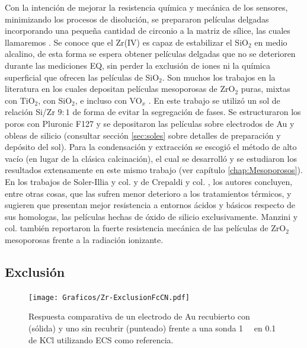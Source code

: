 			Con la intención de mejorar la resistencia química y mecánica de los sensores, minimizando los procesos de disolución, se prepararon películas delgadas incorporando una pequeña cantidad de circonio a la matriz de sílice, las cuales llamaremos \pdmZ. Se conoce que el Zr(IV) es capaz de estabilizar el SiO$_2$ en medio alcalino\cite{Soler-Illia2004}, de esta forma se espera obtener películas delgadas que no se deterioren durante las mediciones EQ, sin perder la exclusión de iones ni la química superficial que ofrecen las películas de SiO$_2$. Son muchos los trabajos en la literatura en los cuales depositan películas mesoporosas de ZrO$_2$ puras, mixtas con TiO$_2$, con SiO$_2$, e incluso con VO$_x$ \cite{Andrini2016,Soler-Illia2004,Crepaldi2002a,Gimenez2016,Zelcer2013,Calvo20210,Angelome2008}. En este trabajo se utilizó un sol de relación Si/Zr $9\!:\!1$ de forma de evitar la segregación de fases\cite{Soler-Illia2004}. Se estructuraron los poros con Pluronic F127 y se depositaron las películas sobre electrodos de Au y obleas de silicio (consultar sección \ref{sec:soles} sobre detalles de preparación y depósito del sol). Para la condensación y extracción se escogió el método de alto vacío (en lugar de la clásica calcinación), el cual se desarrolló y se estudiaron los resultados extensamente en este mismo trabajo (ver capítulo \ref{chap:Mesoporosos}). En los trabajos de Soler-Illia y col.\cite{Soler-Illia2004} y de Crepaldi y col. \cite{Crepaldi2002a}, los autores concluyen, entre otras cosas, que las \pdmZ\space sufren menor deterioro a los tratamientos térmicos, y sugieren que presentan mejor resistencia a entornos ácidos y básicos respecto de sus homologas, las películas hechas de óxido de silicio exclusivamente. Manzini y col.\cite{Gimenez2016} también reportaron la fuerte resistencia mecánica de las películas de ZrO$_2$ mesoporosas frente a la radiación ionizante.

	 \subsection{Exclusión}

 			\begin{figure}[b!]
			\centering
	 	    \texttt{[image: Graficos/Zr-ExclusionFcCN.pdf]}
	        \caption[Exclusión electrostática en \pdmZ]{Respuesta comparativa de un electrodo de Au recubierto con \pdmZ\space (sólida) y uno sin recubrir (punteado) frente a una sonda \ferroferri\space \SI{1}{\milli\Molar} en \SI{0.1}{\Molar} de KCl utilizando ECS como referencia.}
	        \label{fig:fcn-zr}
	      	\end{figure} 

